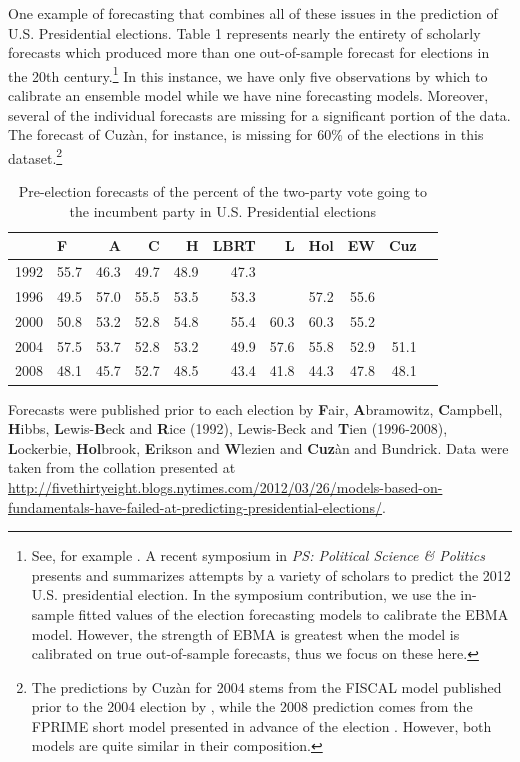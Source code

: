 \documentclass[12pt,fullpage,endnotes]{article}
\begin{document}
One example of forecasting that combines all of these issues in the
prediction of U.S. Presidential elections.  Table 1 represents nearly
the entirety of scholarly forecasts which produced more than one
out-of-sample forecast for elections in the 20th century.\footnote{
  See, for example \citet[][]{Fair:2009, Fair2011, Abramowitz:2008,
    Campbell:2008, hibbs:2012, Lockerbie:2008, Erikson:Wlezien:2008,
    Graefe:2010, Holbrook:2008}.  A recent symposium in {\em PS:
    Political Science \& Politics} presents and summarizes attempts by
  a variety of scholars to predict the 2012 U.S. presidential
  election. In the symposium contribution, we use the in-sample fitted
  values of the election forecasting models to calibrate the EBMA
  model. However, the strength of EBMA is greatest when the model is
  calibrated on true out-of-sample forecasts, thus we focus on these
  here.}  In this instance, we have only five observations by which
to calibrate an ensemble model while we have nine forecasting models.
Moreover, several of the individual forecasts are missing for a
significant portion of the data.  The forecast of Cuz\`an, for
instance, is missing for 60\% of the elections in this
dataset.\footnote{The predictions by Cuz\`an for 2004 stems from the
  FISCAL model published prior to the 2004 election by
  \citet{Cuzan:2004}, while the 2008 prediction comes from the FPRIME
  short model presented in advance of the election
  \citep{Cuzan:Bundrick:2008}. However, both models are quite similar
  in their composition.}

\begin{table}[ht]
\caption{Pre-election forecasts of the percent of the two-party vote going to the incumbent party in U.S. Presidential elections}
\label{tab:one}
\footnotesize
\begin{center}
\begin{tabular}{rlrrrrrrrrr}
  \toprule
  & F & A & C & H & LBRT & L & Hol & EW & Cuz \\ 
  \midrule
  1992 & 55.7 & 46.3 & 49.7 & 48.9 & 47.3 &  &  &  &  \\ 
  1996 & 49.5 & 57.0 & 55.5 & 53.5 & 53.3 &  & 57.2 & 55.6 &  \\ 
  2000 & 50.8 & 53.2 & 52.8 & 54.8 & 55.4 & 60.3 & 60.3 & 55.2 &  \\ 
  2004 & 57.5 & 53.7 & 52.8 & 53.2 & 49.9 & 57.6 & 55.8 & 52.9 & 51.1 \\ 
  2008 & 48.1 & 45.7 & 52.7 & 48.5 & 43.4 & 41.8 & 44.3 & 47.8 & 48.1 \\ 
  \bottomrule

\end{tabular}
\end{center}
Forecasts were published prior to each election by \textbf{F}air, \textbf{A}bramowitz, \textbf{C}ampbell, \textbf{H}ibbs, \textbf{L}ewis-\textbf{B}eck and \textbf{R}ice (1992), Lewis-Beck and \textbf{T}ien  (1996-2008),   \textbf{L}ockerbie, \textbf{Hol}brook, \textbf{E}rikson and \textbf{W}lezien and \textbf{Cuz}\`an and Bundrick.  Data were taken from the collation presented at \url{http://fivethirtyeight.blogs.nytimes.com/2012/03/26/models-based-on-fundamentals-have-failed-at-predicting-presidential-elections/}.
\end{table}
\end{document}
